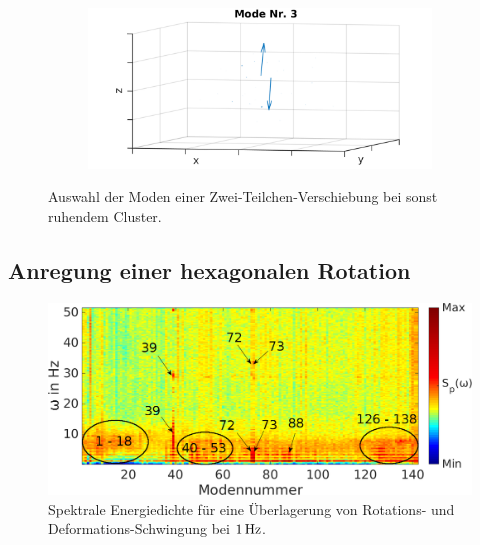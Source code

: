\documentclass[numbers=noenddot,a4paper,notitlepage,twoside,BCOR15mm]{scrbook}
\begin{document}
\begin{figure}[!t]
\begin{subfigure}[t]{0.325\textwidth}
									\includegraphics[width=\textwidth,height=0.7\textwidth]{figs/auswertung/manipulation/dipol3HzModeNr3.png}
								\end{subfigure}
								\caption{Auswahl der Moden einer Zwei-Teilchen-Verschiebung bei sonst ruhendem Cluster.}\label{img:modendipol3Hz}
							\end{figure}

						\subsection*{Anregung einer hexagonalen Rotation}

								\begin{figure}[!b]
									\centering
									\includegraphics[width=\textwidth]{figs/auswertung/manipulation/rotdipol1Hzpowerdens.png}
									\caption{Spektrale Energiedichte für eine Überlagerung von Rotations- und Deformations-Schwingung bei $\unit[1]{Hz}$.}\label{img:rotdipol1Hzpowerdens}
								\end{figure}
\end{document}
